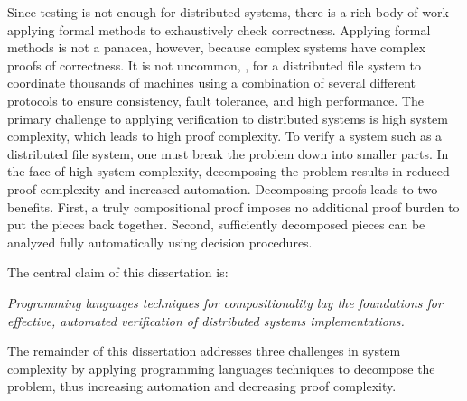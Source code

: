 Since testing is not enough for distributed systems,
  there is a rich body of work applying formal methods
  to exhaustively check correctness.
Applying formal methods is not a panacea, however,
  because complex systems have complex proofs of correctness.
It is not uncommon, \eg,
  for a  distributed file system to coordinate thousands of machines
  using a combination of several different protocols to ensure
  consistency, fault tolerance, and high performance.
The primary challenge to applying verification to distributed systems is
  high system complexity, which leads to high proof complexity.
To verify a system such as a distributed file system,
  one must break the problem down into smaller parts.
In the face of high system complexity,
  decomposing the problem results in reduced proof complexity and increased automation.
Decomposing proofs leads to two benefits.
First, a truly compositional proof
  imposes no additional proof burden
  to put the pieces back together.
Second, sufficiently decomposed pieces can
  be analyzed fully automatically using decision procedures.

The central claim of this dissertation is:
\begin{center}
\emph{Programming languages techniques for compositionality
  lay the foundations for effective, automated verification of
  distributed systems implementations.
}
\end{center}

The remainder of this dissertation addresses three challenges in system complexity
  by applying programming languages techniques to decompose the problem,
  thus increasing automation and decreasing proof complexity.

